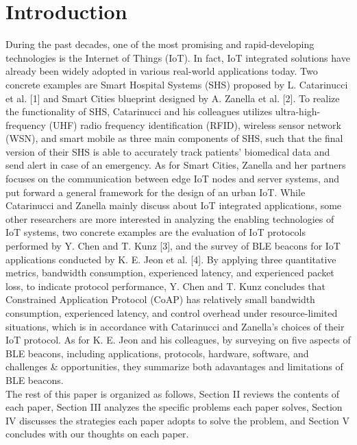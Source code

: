 \documentclass[conference]{IEEEtran}
\begin{document}
\section{Introduction}
During the past decades, one of the most promising and rapid-developing technologies is the Internet of Things (IoT). In fact, IoT integrated solutions have already been widely adopted in various real-world applications today. Two concrete examples are Smart Hospital Systems (SHS) proposed by L. Catarinucci et al. [1] and Smart Cities blueprint designed by A. Zanella et al. [2]. To realize the functionality of SHS, Catarinucci and his colleagues utilizes ultra-high-frequency (UHF) radio frequency
identification (RFID), wireless sensor network (WSN), and
smart mobile as three main components of SHS, such that the final version of their SHS is able to accurately track patients' biomedical data and send alert in case of an emergency. As for Smart Cities, Zanella and her partners focuses on the communication between edge IoT nodes and server systems, and put forward a general framework for the design of an urban IoT. While Catarinucci and Zanella mainly discuss about IoT integrated applications, some other researchers are more interested in analyzing the enabling technologies of IoT systems, two concrete examples are the evaluation of IoT protocols performed by Y. Chen and T. Kunz [3], and the survey of BLE beacons for IoT applications conducted by K. E. Jeon et al. [4]. By applying three quantitative metrics, bandwidth consumption, experienced latency, and experienced packet loss, to indicate protocol performance, Y. Chen and T. Kunz concludes that Constrained Application Protocol (CoAP) has relatively small bandwidth consumption, experienced latency, and control overhead under resource-limited situations, which is in accordance with Catarinucci and Zanella's choices of their IoT protocol. As for K. E. Jeon and his colleagues, by surveying on five aspects of BLE beacons, including applications, protocols, hardware, software, and challenges \& opportunities, they summarize both adavantages and limitations of BLE beacons.\\
\text{\quad}The rest of this paper is organized as follows, Section II
reviews the contents of each paper, Section III analyzes the specific problems each paper solves, Section IV discusses the strategies each paper adopts to solve the problem, and Section V concludes with our thoughts on each paper.\\
\end{document}
